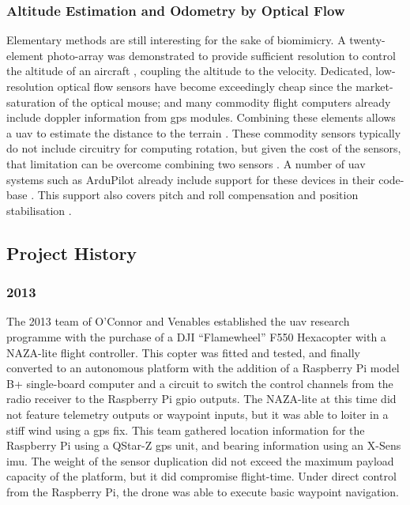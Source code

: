 \documentclass[a4paper, 11pt, titlepage]{article}
\begin{document}
      \subsubsection{Altitude Estimation and Odometry by Optical Flow}
        Elementary methods are still interesting for the sake of biomimicry.  A twenty-element photo-array was demonstrated to provide sufficient resolution to control the altitude of an aircraft \cite{optoAlt}, coupling the altitude to the velocity.
        Dedicated, low-resolution optical flow sensors have become exceedingly cheap since the market-saturation of the optical mouse; and many commodity flight computers already include doppler information from \gls{gps} modules. 
        Combining these elements allows a \gls{uav} to estimate the distance to the terrain \cite{RemTerrain}.  These commodity sensors typically do not include circuitry for computing rotation, but given the cost of the sensors, that limitation can be overcome combining two sensors \cite{FlowRot}.
        A number of \gls{uav} systems such as ArduPilot already include support for these devices in their code-base \cite{ArduFlow}.
        This support also covers pitch and roll compensation and position stabilisation \cite{ArduFlow} \cite{OptoFlowStab}.


    \subsection{Project History}

      \subsubsection{2013}
        The 2013 team of O'Connor \cite{OConnor} and Venables \cite{Venables} established the \gls{uav} research programme with the purchase of a DJI ``Flamewheel'' F550 Hexacopter with a NAZA-lite flight controller.  This copter was fitted and tested, and finally converted to an autonomous platform with the addition of a Raspberry Pi model B+ single-board computer and a circuit to switch the control channels from the radio receiver to the Raspberry Pi \gls{gpio} outputs.
        The NAZA-lite at this time did not feature telemetry outputs or waypoint inputs, but it was able to loiter in a stiff wind using a \gls{gps} fix.
        This team gathered location information for the Raspberry Pi using a QStar-Z \gls{gps} unit, and bearing information using an X-Sens \gls{imu}.  The weight of the sensor duplication did not exceed the maximum payload capacity of the platform, but it did compromise flight-time.
        Under direct control from the Raspberry Pi, the drone was able to execute basic waypoint navigation.
\end{document}
